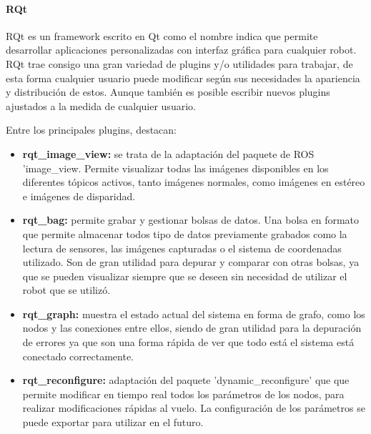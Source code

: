 \paragraph{RQt} \hspace{0pt}

RQt es un framework escrito en Qt como el nombre indica que permite desarrollar
aplicaciones personalizadas con interfaz gráfica para cualquier robot. RQt trae
consigo una gran variedad de plugins y/o utilidades para trabajar, de esta forma
cualquier usuario puede modificar según sus necesidades la apariencia y
distribución de estos. Aunque también es posible escribir nuevos plugins
ajustados a la medida de cualquier usuario.

Entre los principales plugins, destacan:

\begin{itemize}
  \item \textbf{rqt\_image\_view:} se trata de la adaptación del paquete de ROS
  'image\_view. Permite visualizar todas las imágenes disponibles en los
  diferentes tópicos activos, tanto imágenes normales, como imágenes en
  estéreo e imágenes de disparidad.
  \item \textbf{rqt\_bag:} permite grabar y gestionar bolsas de datos. Una bolsa
  en formato que permite almacenar todos tipo de datos previamente grabados como
  la lectura de sensores, las imágenes capturadas o el sistema de coordenadas
  utilizado. Son de gran utilidad para depurar y comparar con otras bolsas, ya
  que se pueden visualizar siempre que se deseen sin necesidad de utilizar el
  robot que se utilizó.
  \item \textbf{rqt\_graph:} muestra el estado actual del sistema en forma de
  grafo, como los nodos y las conexiones entre ellos, siendo de gran utilidad
  para la depuración de errores ya que son una forma rápida de ver que todo está
  el sistema está conectado correctamente.
  \item \textbf{rqt\_reconfigure:} adaptación del paquete 'dynamic\_reconfigure'
  que que permite modificar en tiempo real todos los parámetros de los nodos,
  para realizar modificaciones rápidas al vuelo. La configuración de los
  parámetros se puede exportar para utilizar en el futuro.
\end{itemize}


